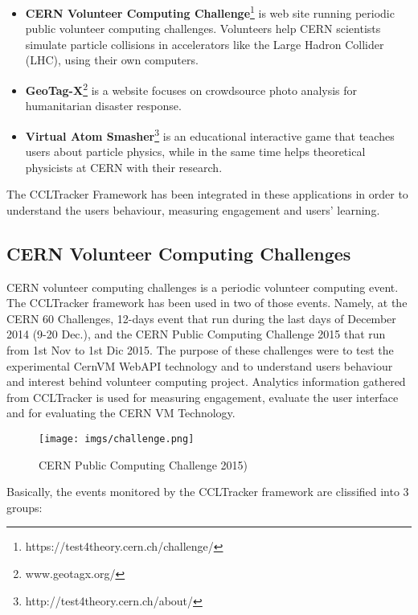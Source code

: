 \documentclass{article}
\begin{document}
\begin{itemize}
\item \textbf{CERN Volunteer Computing Challenge}\footnote{https://test4theory.cern.ch/challenge/} is  web site running periodic public volunteer computing challenges. Volunteers help CERN scientists simulate particle collisions in accelerators like the Large Hadron Collider (LHC), using their own computers. 

\item \textbf{GeoTag-X}\footnote{www.geotagx.org/} is a website focuses on crowdsource photo analysis for humanitarian disaster response.

\item \textbf{Virtual Atom Smasher}\footnote{http://test4theory.cern.ch/about/} is an educational interactive game that teaches users about particle physics, while in the same time helps theoretical physicists at CERN with their research.
\end{itemize}


The CCLTracker Framework has been integrated in these applications in order to understand the users behaviour, measuring engagement and users' learning. 


\subsection{CERN Volunteer Computing Challenges}

CERN volunteer computing challenges is a periodic volunteer computing event. The CCLTracker framework has been used in two of those events. Namely, at the CERN 60 Challenges, 12-days event that run during the last days of December 2014 (9-20 Dec.), and the CERN Public Computing Challenge 2015 that run from 1st Nov to 1st Dic 2015. The purpose of these challenges were to test the experimental CernVM WebAPI technology and to understand users behaviour and interest behind volunteer computing project. Analytics information gathered from CCLTracker is used for measuring engagement, evaluate the user interface and for evaluating the CERN VM Technology. 


\begin{figure}[th]
  \begin{center}
		\texttt{[image: imgs/challenge.png]}
  \end{center}
\caption{CERN Public Computing Challenge 2015)}
\label{img:challenge}
\end{figure}


Basically, the events monitored by the CCLTracker framework are clissified into 3 groups:
\end{document}
